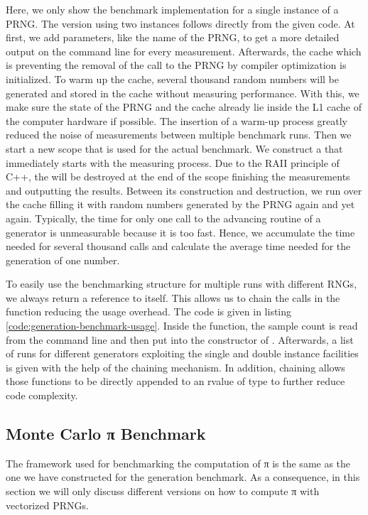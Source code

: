 \documentclass{stdlocal}
\begin{document}
    Here, we only show the benchmark implementation for a single instance of a PRNG.
    The version using two instances follows directly from the given code.
    At first, we add  parameters, like the name of the PRNG, to get a more detailed output on the command line for every measurement.
    Afterwards, the cache which is preventing the removal of the call to the PRNG by compiler optimization is initialized.
    To warm up the cache, several thousand random numbers will be generated and stored in the cache without measuring performance.
    With this, we make sure the state of the PRNG and the cache already lie inside the L1 cache of the computer hardware if possible.
    The insertion of a warm-up process greatly reduced the noise of measurements between multiple benchmark runs.
    Then we start a new scope that is used for the actual benchmark.
    We construct a  that immediately starts with the measuring process.
    Due to the RAII principle of C++, the  will be destroyed at the end of the scope finishing the measurements and outputting the results.
    Between its construction and destruction, we run over the cache filling it with random numbers generated by the PRNG again and yet again.
    Typically, the time for only one call to the advancing routine of a generator is unmeasurable because it is too fast.
    Hence, we accumulate the time needed for several thousand calls and calculate the average time needed for the generation of one number.

    To easily use the benchmarking structure for multiple runs with different RNGs, we always return a reference to itself.
    This allows us to chain the calls in the  function reducing the usage overhead.
    The code is given in listing \ref{code:generation-benchmark-usage}.
    Inside the  function, the sample count is read from the command line and then put into the constructor of .
    Afterwards, a list of runs for different generators exploiting the single and double instance facilities is given with the help of the chaining mechanism.
    In addition, chaining allows those functions to be directly appended to an rvalue of type  to further reduce code complexity.

  \subsection{Monte Carlo π Benchmark} %
  \label{sub:monte_carlo_π_benchmark}
    The framework used for benchmarking the computation of π is the same as the one we have constructed for the generation benchmark.
    As a consequence, in this section we will only discuss different versions on how to compute π with vectorized PRNGs.
\end{document}
